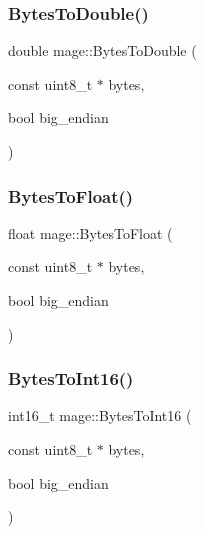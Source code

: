 \hypertarget{namespacemage_af85b8ba1e336f37fc8fe34a53e981a6c}{}\label{namespacemage_af85b8ba1e336f37fc8fe34a53e981a6c} 
\subsubsection{\texorpdfstring{Bytes\+To\+Double()}{BytesToDouble()}}
{\footnotesize\ttfamily double mage\+::\+Bytes\+To\+Double (\begin{DoxyParamCaption}\item[{const uint8\+\_\+t $\ast$}]{bytes,  }\item[{bool}]{big\+\_\+endian }\end{DoxyParamCaption})}

\hypertarget{namespacemage_a5e41913a3a1613add8511e5834e09277}{}\label{namespacemage_a5e41913a3a1613add8511e5834e09277} 
\subsubsection{\texorpdfstring{Bytes\+To\+Float()}{BytesToFloat()}}
{\footnotesize\ttfamily float mage\+::\+Bytes\+To\+Float (\begin{DoxyParamCaption}\item[{const uint8\+\_\+t $\ast$}]{bytes,  }\item[{bool}]{big\+\_\+endian }\end{DoxyParamCaption})}

\hypertarget{namespacemage_a7db26a377fbab44bd501ccdb55a86067}{}\label{namespacemage_a7db26a377fbab44bd501ccdb55a86067} 
\subsubsection{\texorpdfstring{Bytes\+To\+Int16()}{BytesToInt16()}}
{\footnotesize\ttfamily int16\+\_\+t mage\+::\+Bytes\+To\+Int16 (\begin{DoxyParamCaption}\item[{const uint8\+\_\+t $\ast$}]{bytes,  }\item[{bool}]{big\+\_\+endian }\end{DoxyParamCaption})}

\hypertarget{namespacemage_a274862b36cabc10b90dd7148d42a29a6}{}\label{namespacemage_a274862b36cabc10b90dd7148d42a29a6} 
